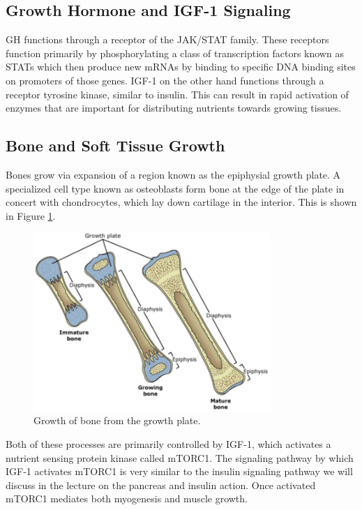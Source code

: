 \documentclass{tufte-handout}
\begin{document}
\subsection{Growth Hormone and IGF-1 Signaling}

GH functions through a receptor of the JAK/STAT family.  These receptors function primarily by phosphorylating a class of transcription factors known as STATs which then produce new mRNAs by binding to specific DNA binding sites on promoters of those genes.  IGF-1 on the other hand functions through a receptor tyrosine kinase, similar to insulin.  This can result in rapid activation of enzymes that are important for distributing nutrients towards growing tissues.

\subsection{Bone and Soft Tissue Growth}

Bones grow via expansion of a region known as the epiphysial growth plate.  A specialized cell type known as osteoblasts form bone at the edge of the plate in concert with chondrocytes, which lay down cartilage in the interior.  This is shown in Figure \ref{fig:bone-growth}.

\begin{figure}
\centering
  \includegraphics[width=0.8\textwidth]{figures/bone-growth}
  \caption{Growth of bone from the growth plate.}
    \label{fig:bone-growth}
\end{figure}


  Both of these processes are primarily controlled by IGF-1, which activates a nutrient sensing protein kinase called mTORC1.  The signaling pathway by which IGF-1 activates mTORC1 is very similar to the insulin signaling pathway we will discuss in the lecture on the pancreas and insulin action.  Once activated mTORC1 mediates both myogenesis and muscle growth.
\end{document}
